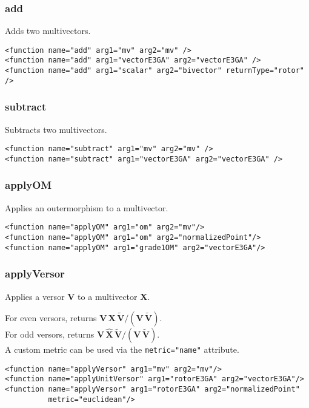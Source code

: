 \documentclass[10pt, a4paper]{article}
\newcommand{\gav}[1]{\ensuremath{\mathbf{#1}}}
\newcommand{\gp}{\,}
\newcommand{\rev}[1]{\widetilde{#1}}
\begin{document}
\subsubsection*{add}

Adds two multivectors.
\begin{verbatim}
<function name="add" arg1="mv" arg2="mv" />
<function name="add" arg1="vectorE3GA" arg2="vectorE3GA" />
<function name="add" arg1="scalar" arg2="bivector" returnType="rotor" />
\end{verbatim}

\subsubsection*{subtract}

Subtracts two multivectors.
\begin{verbatim}
<function name="subtract" arg1="mv" arg2="mv" />
<function name="subtract" arg1="vectorE3GA" arg2="vectorE3GA" />
\end{verbatim}

\subsubsection*{applyOM}

Applies an outermorphism to a multivector.
\begin{verbatim}
<function name="applyOM" arg1="om" arg2="mv"/>
<function name="applyOM" arg1="om" arg2="normalizedPoint"/>
<function name="applyOM" arg1="grade1OM" arg2="vectorE3GA"/>
\end{verbatim}


\subsubsection*{applyVersor}

Applies a versor \gav{V} to a multivector \gav{X}.

\noindent For even versors, returns $\gav{V} \gp \gav{X} \gp \rev{\gav{V}} / (\gav{V} \gp \rev{\gav{V}})$.\\
For odd versors, returns $\gav{V} \gp \hat{\gav{X}} \gp \rev{\gav{V}} / (\gav{V} \gp \rev{\gav{V}})$.\\

\noindent A custom metric can be used via the {\tt metric="name"} attribute.
\begin{verbatim}
<function name="applyVersor" arg1="mv" arg2="mv"/>
<function name="applyUnitVersor" arg1="rotorE3GA" arg2="vectorE3GA"/>
<function name="applyVersor" arg1="rotorE3GA" arg2="normalizedPoint"  
          metric="euclidean"/>
\end{verbatim}
\end{document}
